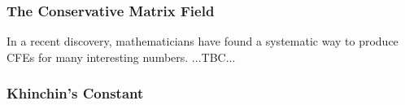 \subsubsection{The Conservative Matrix Field}
In a recent discovery, mathematicians have found a systematic way to produce CFEs for many interesting numbers. ...TBC...



\subsubsection{Khinchin's Constant}


